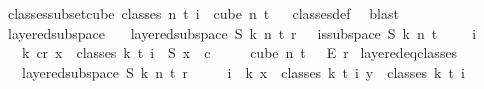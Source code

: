 \begin{isabellebody}
\isanewline
{}\isamarkupfalse%
\ classes{\isacharunderscore}{\kern0pt}subset{\isacharunderscore}{\kern0pt}cube{\isacharcolon}{\kern0pt}\ {\isachardoublequoteopen}classes\ n\ t\ i\ {\isasymsubseteq}\ cube\ n\ {\isacharparenleft}{\kern0pt}t{\isacharplus}{\kern0pt}{}{\isacharparenright}{\kern0pt}{\isachardoublequoteclose}%
\isadelimproof
\ %
\endisadelimproof
%
\isatagproof
{}\isamarkupfalse%
\ classes{\isacharunderscore}{\kern0pt}def\ \isamarkupfalse%
\ blast%
\endisatagproof
{\isafoldproof}%
%
\isadelimproof
%
\endisadelimproof
\isanewline
\isanewline
{}\isamarkupfalse%
\ layered{\isacharunderscore}{\kern0pt}subspace\isanewline
\ \ \ {\isachardoublequoteopen}layered{\isacharunderscore}{\kern0pt}subspace\ S\ k\ n\ t\ r\ {\isasymchi}\ {\isasymequiv}\ {\isacharparenleft}{\kern0pt}is{\isacharunderscore}{\kern0pt}subspace\ S\ k\ n\ {\isacharparenleft}{\kern0pt}t\ {\isacharplus}{\kern0pt}\ {}{\isacharparenright}{\kern0pt}\ \ {\isasymand}\ {\isacharparenleft}{\kern0pt}{\isasymforall}i\isanewline
\ \ {\isasymin}\ {\isacharbraceleft}{\kern0pt}{\isachardot}{\kern0pt}{\isachardot}{\kern0pt}k{\isacharbraceright}{\kern0pt}{\isachardot}{\kern0pt}\ {\isasymexists}c{\isacharless}{\kern0pt}r{\isachardot}{\kern0pt}\ {\isasymforall}x\ {\isasymin}\ classes\ k\ t\ i{\isachardot}{\kern0pt}\ {\isasymchi}\ {\isacharparenleft}{\kern0pt}S\ x{\isacharparenright}{\kern0pt}\ {\isacharequal}{\kern0pt}\ c{\isacharparenright}{\kern0pt}{\isacharparenright}{\kern0pt}\ {\isasymand}\ {\isasymchi}\ {\isasymin}\isanewline
\ \ cube\ n\ {\isacharparenleft}{\kern0pt}t\ {\isacharplus}{\kern0pt}\ {}{\isacharparenright}{\kern0pt}\ {\isasymrightarrow}\isactrlsub E\ {\isacharbraceleft}{\kern0pt}{\isachardot}{\kern0pt}{\isachardot}{\kern0pt}{\isacharless}{\kern0pt}r{\isacharbraceright}{\kern0pt}{\isachardoublequoteclose}\isanewline
\isanewline
{}\isamarkupfalse%
\ layered{\isacharunderscore}{\kern0pt}eq{\isacharunderscore}{\kern0pt}classes{\isacharcolon}{\kern0pt}\ \isanewline
\ \ \ {\isachardoublequoteopen}layered{\isacharunderscore}{\kern0pt}subspace\ S\ k\ n\ t\ r\ {\isasymchi}{\isachardoublequoteclose}\ \isanewline
\ \ \ {\isachardoublequoteopen}{\isasymforall}i\ {\isasymin}\ {\isacharbraceleft}{\kern0pt}{\isachardot}{\kern0pt}{\isachardot}{\kern0pt}k{\isacharbraceright}{\kern0pt}{\isachardot}{\kern0pt}\ {\isasymforall}x\ {\isasymin}\ classes\ k\ t\ i{\isachardot}{\kern0pt}\ {\isasymforall}y\ {\isasymin}\ classes\ k\ t\ i{\isachardot}{\kern0pt}\isanewline

\end{isabellebody}
